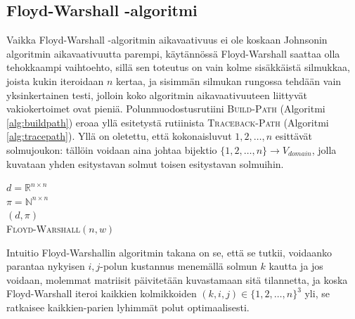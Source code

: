\documentclass[finnish]{tktltiki2}
\newenvironment{finalgo}[1][htb]{
  \renewcommand{\algorithmcfname}{Algoritmi}
  \begin{algorithm}[#1]
}{\end{algorithm}}
\theoremstyle{definition}
\theoremstyle{remark}
\begin{document}
\subsection{Floyd-Warshall -algoritmi}
Vaikka Floyd-Warshall -algoritmin aikavaativuus ei ole koskaan Johnsonin algoritmin aikavaativuutta parempi, käytännössä Floyd-Warshall saattaa olla tehokkaampi vaihtoehto, sillä sen toteutus on vain kolme sisäkkäistä silmukkaa, joista kukin iteroidaan $n$ kertaa, ja sisimmän silmukan rungossa tehdään vain yksinkertainen testi, jolloin koko algoritmin aikavaativuuteen liittyvät vakiokertoimet ovat pieniä. Polunmuodostusrutiini \textsc{Build-Path} (Algoritmi \ref{alg:buildpath}) eroaa yllä esitetystä rutiinista \textsc{Traceback-Path} (Algoritmi \ref{alg:tracepath}). Yllä on oletettu, että kokonaisluvut $1, 2, \dots, n$ esittävät solmujoukon: tällöin voidaan aina johtaa bijektio $\{ 1, 2, \dots, n \} \to V_{domain}$, jolla kuvataan yhden esitystavan solmut toisen esitystavan solmuihin.
\begin{finalgo}[h]
  $d = \mathbb{R}^{n \times n}$ \\
  $\pi = \mathbb{N}^{n \times n}$ \\
   \KwRet $(d, \pi)$ \\
\caption{\textsc{Floyd-Warshall}$(n, w)$}
\label{alg:warshall}
\end{finalgo}

Intuitio Floyd-Warshallin algoritmin takana on se, että se tutkii, voidaanko parantaa nykyisen $i, j$-polun kustannus menemällä solmun $k$ kautta ja jos voidaan, molemmat matriisit päivitetään kuvastamaan sitä tilannetta, ja koska Floyd-Warshall iteroi kaikkien kolmikkoiden $(k, i, j) \in \{ 1, 2, \dots, n \}^3$
yli, se ratkaisee kaikkien-parien lyhimmät polut optimaalisesti.
\end{document}
